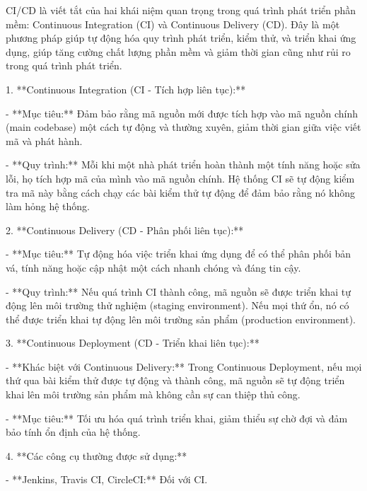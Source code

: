 








CI/CD là viết tắt của hai khái niệm quan trọng trong quá trình phát triển phần mềm: Continuous Integration (CI) và Continuous Delivery (CD). Đây là một phương pháp giúp tự động hóa quy trình phát triển, kiểm thử, và triển khai ứng dụng, giúp tăng cường chất lượng phần mềm và giảm thời gian cũng như rủi ro trong quá trình phát triển.

1. **Continuous Integration (CI - Tích hợp liên tục):**

- **Mục tiêu:** Đảm bảo rằng mã nguồn mới được tích hợp vào mã nguồn chính (main codebase) một cách tự động và thường xuyên, giảm thời gian giữa việc viết mã và phát hành.

- **Quy trình:** Mỗi khi một nhà phát triển hoàn thành một tính năng hoặc sửa lỗi, họ tích hợp mã của mình vào mã nguồn chính. Hệ thống CI sẽ tự động kiểm tra mã này bằng cách chạy các bài kiểm thử tự động để đảm bảo rằng nó không làm hỏng hệ thống.

2. **Continuous Delivery (CD - Phân phối liên tục):**

- **Mục tiêu:** Tự động hóa việc triển khai ứng dụng để có thể phân phối bản vá, tính năng hoặc cập nhật một cách nhanh chóng và đáng tin cậy.

- **Quy trình:** Nếu quá trình CI thành công, mã nguồn sẽ được triển khai tự động lên môi trường thử nghiệm (staging environment). Nếu mọi thứ ổn, nó có thể được triển khai tự động lên môi trường sản phẩm (production environment).

3. **Continuous Deployment (CD - Triển khai liên tục):**

- **Khác biệt với Continuous Delivery:** Trong Continuous Deployment, nếu mọi thứ qua bài kiểm thử được tự động và thành công, mã nguồn sẽ tự động triển khai lên môi trường sản phẩm mà không cần sự can thiệp thủ công.

- **Mục tiêu:** Tối ưu hóa quá trình triển khai, giảm thiểu sự chờ đợi và đảm bảo tính ổn định của hệ thống.

4. **Các công cụ thường được sử dụng:**

- **Jenkins, Travis CI, CircleCI:** Đối với CI.

